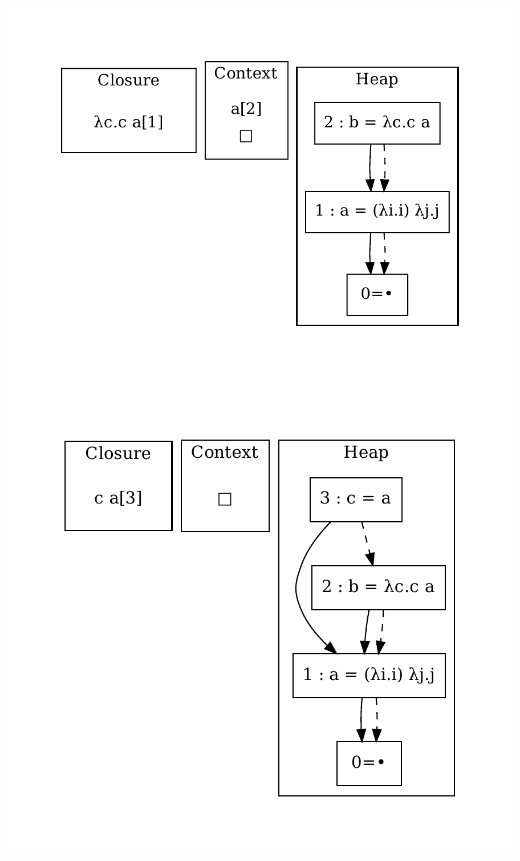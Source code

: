 \includegraphics[width=\linewidth/2]{figures/8.pdf}
\includegraphics[width=\linewidth/2]{figures/9.pdf}
